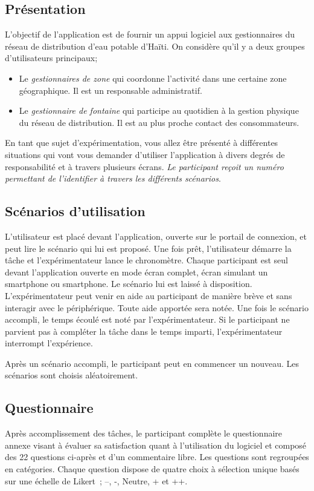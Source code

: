 \documentclass[a4paper, 11pt]{article}
\begin{document}
    \subsection*{Présentation}
        L'objectif de l'application est de fournir un appui logiciel aux gestionnaires du réseau de distribution d'eau potable d'Haïti. On considère qu'il y a deux groupes d'utilisateurs principaux;
        \begin{itemize}
            \item Le \emph{gestionnaires de zone} qui coordonne l'activité dans une certaine zone géographique. Il est un responsable administratif.
            \item Le \emph{gestionnaire de fontaine} qui participe au quotidien à la gestion physique du réseau de distribution. Il est au plus proche contact des consommateurs.
        \end{itemize}
        En tant que sujet d'expérimentation, vous allez être présenté à différentes situations qui vont vous demander d'utiliser l'application à divers degrés de responsabilité et à travers plusieurs écrans. \emph{Le participant reçoit un numéro permettant de l'identifier à travers les différents scénarios}.

    \subsection*{Scénarios d'utilisation}
        L'utilisateur est placé devant l'application, ouverte sur le portail de connexion, et peut lire le scénario qui lui est proposé. Une fois prêt, l'utilisateur démarre la tâche et l'expérimentateur lance le chronomètre. Chaque participant est seul devant l'application ouverte en mode écran complet, écran simulant un smartphone ou smartphone. Le scénario lui est laissé à disposition. L'expérimentateur peut venir en aide au participant de manière brève et sans interagir avec le périphérique. Toute aide apportée sera notée. Une fois le scénario accompli, le temps écoulé est noté par l'expérimentateur. Si le participant ne parvient pas à compléter la tâche dans le temps imparti, l'expérimentateur interrompt l'expérience.

        Après un scénario accompli, le participant peut en commencer un nouveau. Les scénarios sont choisis aléatoirement.

    \subsection*{Questionnaire}
        Après accomplissement des tâches, le participant complète le questionnaire annexe visant à évaluer sa satisfaction quant à l'utilisation du logiciel et composé des 22 questions ci-après et d'un commentaire libre. Les questions sont regroupées en catégories. Chaque question dispose
        de quatre choix à sélection unique basés sur une échelle de Likert~\cite{wikipediaLikertScale}; --, -, Neutre, + et ++.
\end{document}
